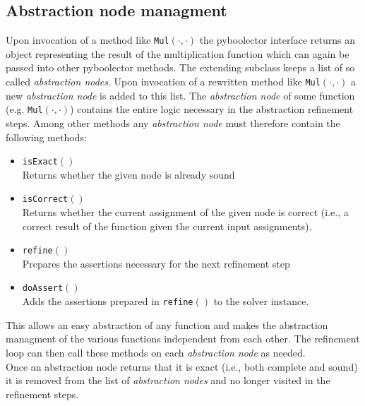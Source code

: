 \subsection{Abstraction node managment}
Upon invocation of a method like \texttt{Mul$\left(\cdot,\cdot\right)$} the pyboolector interface returns an object representing the result of the
multiplication function which can again be passed into other pyboolector methods.
The extending subclass keeps a list of so called \textit{abstraction nodes}. Upon invocation of a rewritten method like \texttt{Mul$\left(\cdot,\cdot\right)$} a new \textit{abstraction node}
is added to this list. The \textit{abstraction node} of some function (e.g. \texttt{Mul$\left(\cdot,\cdot\right)$}) contains the entire logic necessary in the abstraction refinement steps.
Among other methods any \textit{abstraction node} must therefore contain the following methods:
\begin{itemize}
    \item \texttt{isExact$\left(\right)$}\\
    Returns whether the given node is already sound
    \item \texttt{isCorrect$\left(\right)$}\\
    Returns whether the current assignment of the given node is correct (i.e., a correct result of the function given the current input assignments).
    \item \texttt{refine$\left(\right)$}\\
    Prepares the assertions necessary for the next refinement step
    \item \texttt{doAssert$\left(\right)$}\\
    Adds the assertions prepared in \texttt{refine$\left(\right)$} to the solver instance.
\end{itemize}
This allows an easy abstraction of any function and makes the abstraction managment of the various functions independent from each other.
The refinement loop can then call these methods on each \textit{abstraction node} as needed.\\
Once an abstraction node returns that it is exact (i.e., both complete and sound) it is removed from the list of \textit{abstraction nodes} and no longer visited in the refinement steps.

